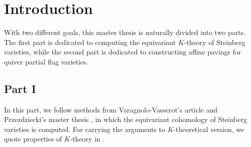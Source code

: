 \chapter*{Introduction}

With two different goals, this master thesis is naturally divided into two parts. The first part is dedicated to computing the equivariant $K$-theory of Steinberg varieties, while the second part is dedicated to constructing affine pavings for quiver partial flag varieties.

\section*{Part I}

In this part, we follow methods from Varagnolo-Vasserot's article \cite{varagnolo2011canonical} and Przezdziecki's master thesis \cite{przezdziecki2015geometric}, in which the equivariant cohomology of Steinberg varieties is computed. For carrying the arguments to $K$-theoretical version, we quote properties of $K$-theory in \cite[Chapter 5]{chriss1997representation}.

